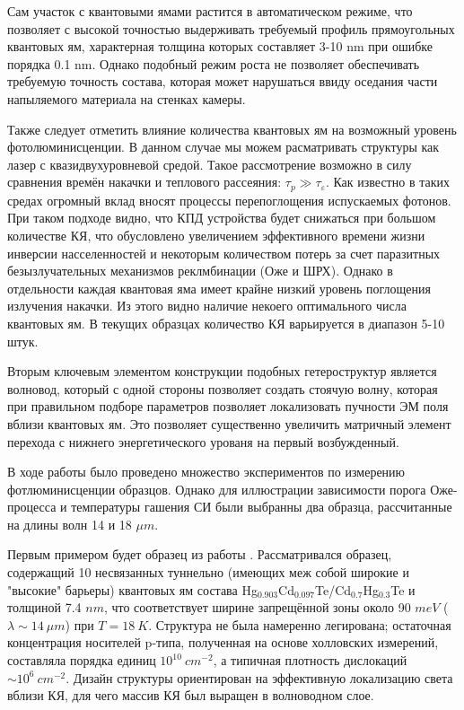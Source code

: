 \documentclass[../main.tex]{subfiles}
\begin{document}
    Сам участок с квантовыми ямами растится в автоматическом режиме, что позволяет с высокой точностью выдерживать
    требуемый профиль прямоугольных квантовых ям, характерная толщина которых составляет 3-10 nm при ошибке порядка 0.1 nm.
    Однако подобный режим роста не позволяет обеспечивать требуемую точность состава, которая может нарушаться ввиду оседания
    части напыляемого материала на стенках камеры.

    Также следует отметить влияние количества квантовых ям на возможный уровень фотолюминисценции. В данном случае мы можем расматривать
    структуры как лазер с квазидвухуровневой средой. Такое рассмотрение возможно в силу сравнения времён накачки и теплового рассеяния:
    $\tau_p \gg \tau_\varepsilon$. Как известно в таких средах огромный вклад вносят процессы перепоглощения испускаемых фотонов. При таком
    подходе видно, что КПД устройства будет снижаться при большом количестве КЯ, что обусловлено увеличением эффективного времени жизни инверсии
    насселенностей и некоторым количеством потерь за счет паразитных безызлучательных механизмов реклмбинации (Оже и ШРХ). Однако в отдельности
    каждая квантовая яма имеет крайне низкий уровень поглощения излучения накачки. Из этого видно наличие некоего
    оптимального числа квантовых ям. В текущих образцах количество КЯ варьируется в диапазон 5-10 штук.

    Вторым ключевым элементом конструкции подобных гетероструктур является волновод, который с одной стороны позволяет создать стоячую волну, которая
    при правильном подборе параметров позволяет локализовать пучности ЭМ поля вблизи квантовых ям.
    Это позволяет существенно увеличить матричный элемент перехода с нижнего энергетического урованя на первый возбужденный.

    В ходе работы было проведено множество экспериментов по измерению фотлюминисценции образцов.
    Однако для иллюстрации зависимости порога Оже-процесса и температуры гашения СИ были выбранны 
    два образца, рассчитанные на длины волн 14 и 18 $\mu m$.

    Первым примером будет образец из работы \cite{Utochkin:PTS:2019}. Рассматривался образец, содержащий 10 несвязанных туннельно
    (имеющих меж собой широкие и "высокие" барьеры) квантовых ям
    состава Hg${}_{0.903}$Cd${}_{0.097}$Te/Cd${}_0.7$Hg${}_{0.3}$Te и толщиной 7.4 $nm$, что соответствует ширине 
    запрещённой зоны около 90 $meV$ ($\lambda \sim 14~\mu m$) при $T = 18 ~K$. Структура не была намеренно легирована; остаточная концентрация 
    носителей p-типа, полученная на основе холловских измерений, составляла порядка единиц $10^{10}~cm^{-2}$, а типичная 
    плотность дислокаций $\sim 10^6~cm^{-2}$. Дизайн структуры ориентирован на эффективную локализацию света вблизи КЯ, для 
    чего массив КЯ был выращен в волноводном слое. 
\end{document}
